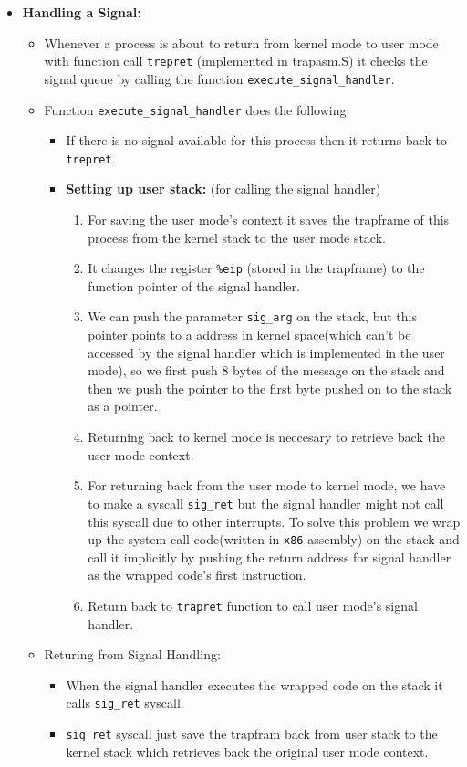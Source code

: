 \documentclass[a4 paper]{article}
\newcommand{\code}[1]{\texttt{#1}}
\begin{document}
\begin{itemize}
\item \textbf{Handling a Signal:}
\begin{itemize}
  \item Whenever a process is about to return from kernel mode to user mode with function call \code{trepret} (implemented in trapasm.S) it checks the signal queue by calling the function \code{execute\_signal\_handler}.
  \item Function \code{execute\_signal\_handler} does the following:
  \begin{itemize}
    \item If there is no signal available for this process then it returns back to \code{trepret}.
    \item \textbf{Setting up user stack:} (for calling the signal handler)
    \begin{enumerate}
      \item For saving the user mode's context it saves the trapframe of this process from the kernel stack to the user mode stack.
      \item It changes the register \code{\%eip} (stored in the trapframe) to the function pointer of the signal handler.
      \item We can push the parameter \code{sig\_arg} on the stack, but this pointer points to a address in kernel space(which can't be accessed by the signal handler which is implemented in the user mode), so we first push 8 bytes of the message on the stack and then we push the pointer to the first byte pushed on to the stack as a pointer.
      \item Returning back to kernel mode is neccesary to retrieve back the user mode context.
      \item For returning back from the user mode to kernel mode, we have to make a syscall \code{sig\_ret} but the signal handler might not call this syscall due to other interrupts. To solve this problem we wrap up the system call code(written in \code{x86} assembly) on the stack and call it implicitly by pushing the return address for signal handler as the wrapped code's first instruction.
      \item Return back to \code{trapret} function to call user mode's signal handler.
    \end{enumerate}
  \end{itemize}

  \item Returing from Signal Handling:
  \begin{itemize}
    \item When the signal handler executes the wrapped code on the stack it calls \code{sig\_ret} syscall.
    \item \code{sig\_ret} syscall just save the trapfram back from user stack to the kernel stack which retrieves back the original user mode context.
  \end{itemize}
\end{itemize}


\end{itemize}
\end{document}
